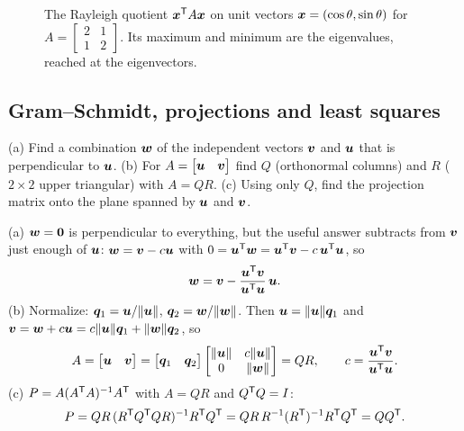\begin{figure}[ht]\centering
{}
\caption{The Rayleigh quotient $\boldsymbol{x}^{\mathsf{T}} A\boldsymbol{x}$ on unit vectors $\boldsymbol{x}=(\cos\theta,\sin\theta)$ for $A=\begin{bmatrix}2&1\\1&2\end{bmatrix}$. Its maximum and minimum are the eigenvalues, reached at the eigenvectors.}\label{fig:u40-rayleigh}
\end{figure}

\subsection{Gram--Schmidt, projections and least squares}

\begin{exercise}[Question 6]\label{exr:u40-q6}
(a) Find a combination $\boldsymbol{w}$ of the independent vectors $\boldsymbol{v}$ and $\boldsymbol{u}$ that is perpendicular to $\boldsymbol{u}$.
(b) For $A=\begin{bmatrix}\boldsymbol{u}&\boldsymbol{v}\end{bmatrix}$ find $Q$ (orthonormal columns) and $R$ ($2\times2$ upper triangular) with $A=QR$.
(c) Using only $Q$, find the projection matrix onto the plane spanned by $\boldsymbol{u}$ and $\boldsymbol{v}$.
\end{exercise}
\begin{solution}
(a) $\boldsymbol{w}=\boldsymbol{0}$ is perpendicular to everything, but the useful answer subtracts from $\boldsymbol{v}$ just enough of $\boldsymbol{u}$: $\boldsymbol{w}=\boldsymbol{v}-c\boldsymbol{u}$ with $0=\boldsymbol{u}^{\mathsf{T}}\boldsymbol{w}=\boldsymbol{u}^{\mathsf{T}}\boldsymbol{v}-c\,\boldsymbol{u}^{\mathsf{T}}\boldsymbol{u}$, so
\[
\boldsymbol{w}=\boldsymbol{v}-\frac{\boldsymbol{u}^{\mathsf{T}}\boldsymbol{v}}{\boldsymbol{u}^{\mathsf{T}}\boldsymbol{u}}\,\boldsymbol{u}.
\]
(b) Normalize: $\boldsymbol{q}_1=\boldsymbol{u}/\|\boldsymbol{u}\|$, $\boldsymbol{q}_2=\boldsymbol{w}/\|\boldsymbol{w}\|$. Then $\boldsymbol{u}=\|\boldsymbol{u}\|\boldsymbol{q}_1$ and $\boldsymbol{v}=\boldsymbol{w}+c\boldsymbol{u}=c\|\boldsymbol{u}\|\boldsymbol{q}_1+\|\boldsymbol{w}\|\boldsymbol{q}_2$, so
\[
A=\begin{bmatrix}\boldsymbol{u}&\boldsymbol{v}\end{bmatrix}=\begin{bmatrix}\boldsymbol{q}_1&\boldsymbol{q}_2\end{bmatrix}\begin{bmatrix}\|\boldsymbol{u}\|&c\|\boldsymbol{u}\|\\0&\|\boldsymbol{w}\|\end{bmatrix}=QR,\qquad c=\frac{\boldsymbol{u}^{\mathsf{T}}\boldsymbol{v}}{\boldsymbol{u}^{\mathsf{T}}\boldsymbol{u}}.
\]
(c) $P=A(A^{\mathsf{T}} A)^{-1}A^{\mathsf{T}}$ with $A=QR$ and $Q^{\mathsf{T}} Q=I$:
\[
P=QR\,(R^{\mathsf{T}} Q^{\mathsf{T}} QR)^{-1}R^{\mathsf{T}} Q^{\mathsf{T}}=QR\,R^{-1}(R^{\mathsf{T}})^{-1}R^{\mathsf{T}} Q^{\mathsf{T}}=QQ^{\mathsf{T}}.
\]
\end{solution}

